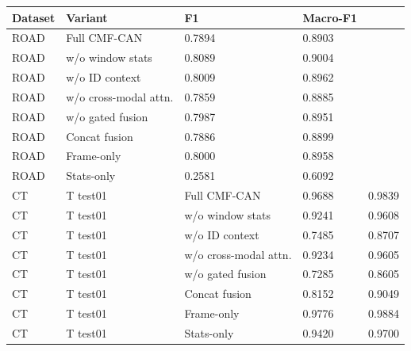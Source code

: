 \begin{tabular}{llll}
\toprule
Dataset & Variant & F1 & Macro-F1 \\
\midrule
ROAD & Full CMF-CAN & 0.7894 & 0.8903 \\
ROAD & w/o window stats & 0.8089 & 0.9004 \\
ROAD & w/o ID context & 0.8009 & 0.8962 \\
ROAD & w/o cross-modal attn. & 0.7859 & 0.8885 \\
ROAD & w/o gated fusion & 0.7987 & 0.8951 \\
ROAD & Concat fusion & 0.7886 & 0.8899 \\
ROAD & Frame-only & 0.8000 & 0.8958 \\
ROAD & Stats-only & 0.2581 & 0.6092 \\
CT&T test01 & Full CMF-CAN & 0.9688 & 0.9839 \\
CT&T test01 & w/o window stats & 0.9241 & 0.9608 \\
CT&T test01 & w/o ID context & 0.7485 & 0.8707 \\
CT&T test01 & w/o cross-modal attn. & 0.9234 & 0.9605 \\
CT&T test01 & w/o gated fusion & 0.7285 & 0.8605 \\
CT&T test01 & Concat fusion & 0.8152 & 0.9049 \\
CT&T test01 & Frame-only & 0.9776 & 0.9884 \\
CT&T test01 & Stats-only & 0.9420 & 0.9700 \\
\bottomrule
\end{tabular}
